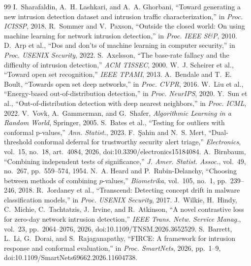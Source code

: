 \documentclass[conference]{IEEEtran}
\begin{document}

\begin{thebibliography}{99}
 I.~Sharafaldin, A.~H. Lashkari, and A.~A. Ghorbani, ``Toward generating a new intrusion detection dataset and intrusion traffic characterization,'' in \textit{Proc. ICISSP}, 2018.
 R.~Sommer and V.~Paxson, ``Outside the closed world: On using machine learning for network intrusion detection,'' in \textit{Proc. IEEE S\&P}, 2010.
 D.~Arp et al., ``Dos and don'ts of machine learning in computer security,'' in \textit{Proc. USENIX Security}, 2022.
 S.~Axelsson, ``The base-rate fallacy and the difficulty of intrusion detection,'' \textit{ACM TISSEC}, 2000.
 W.~J. Scheirer et al., ``Toward open set recognition,'' \textit{IEEE TPAMI}, 2013.
 A.~Bendale and T.~E. Boult, ``Towards open set deep networks,'' in \textit{Proc. CVPR}, 2016.
 W.~Liu et al., ``Energy-based out-of-distribution detection,'' in \textit{Proc. NeurIPS}, 2020.
 Y.~Sun et al., ``Out-of-distribution detection with deep nearest neighbors,'' in \textit{Proc. ICML}, 2022.
 V.~Vovk, A.~Gammerman, and G.~Shafer, \textit{Algorithmic Learning in a Random World}, Springer, 2005.
 S.~Bates et al., ``Testing for outliers with conformal p-values,'' \textit{Ann. Statist.}, 2023.
 F.~\c{S}ahin and N.~S. Mert, ``Dual-threshold conformal deferral for trustworthy security alert triage,'' \textit{Electronics}, vol.~15, no.~18, art.~4084, 2026, doi:10.3390/electronics15184084.
 A.~Birnbaum, ``Combining independent tests of significance,'' \textit{J. Amer. Statist. Assoc.}, vol.~49, no.~267, pp.~559--574, 1954.
 N.~A. Heard and P.~Rubin-Delanchy, ``Choosing between methods of combining $p$-values,'' \textit{Biometrika}, vol.~105, no.~1, pp.~239--246, 2018.
 R.~Jordaney et al., ``Transcend: Detecting concept drift in malware classification models,'' in \textit{Proc. USENIX Security}, 2017.
 J.~Wilkie, H.~Hindy, C.~Michie, C.~Tachtatzis, J.~Irvine, and R.~Atkinson, ``A novel contrastive loss for zero-day network intrusion detection,'' \textit{IEEE Trans. Netw. Service Manag.}, vol.~23, pp.~2064--2076, 2026, doi:10.1109/TNSM.2026.3652529.
 S.~Barrett, L.~Li, G.~Dorai, and S.~Rajaganapathy, ``FIRCE: A framework for intrusion response and conformal evaluation,'' in \textit{Proc. SmartNets}, 2026, pp.~1--9, doi:10.1109/SmartNets69662.2026.11604738.

\end{thebibliography}
\end{document}
